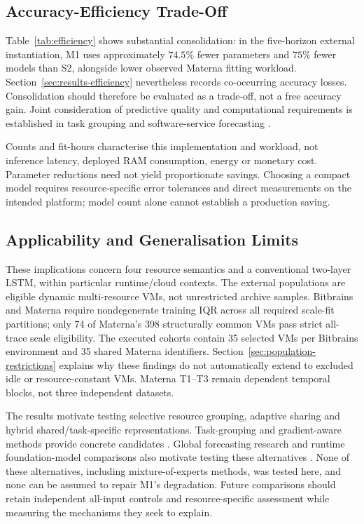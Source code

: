 \documentclass[a4paper,fleqn]{cas-dc}
\begin{document}
\subsection{Accuracy-Efficiency Trade-Off}
\label{sec:discussion-efficiency}

Table~\ref{tab:efficiency} shows substantial consolidation: in the five-horizon
external instantiation, M1 uses approximately $74.5\%$ fewer parameters and
$75\%$ fewer models than S2, alongside lower observed Materna fitting workload.
Section~\ref{sec:results-efficiency} nevertheless records co-occurring accuracy
losses. Consolidation should therefore be evaluated as a trade-off, not a free
accuracy gain. Joint consideration of predictive quality and computational
requirements is established in task grouping and software-service forecasting
\citep{Standley2020TaskGrouping,Syu2017DynamicQoS}.

Counts and fit-hours characterise this implementation and workload, not
inference latency, deployed RAM consumption, energy or monetary cost.
Parameter reductions need not yield proportionate savings. Choosing a compact
model requires resource-specific error tolerances and direct measurements on
the intended platform; model count alone cannot establish a production saving.

\subsection{Applicability and Generalisation Limits}
\label{sec:discussion-applicability}

These implications concern four resource semantics and a conventional
two-layer LSTM, within particular runtime/cloud contexts. The external
populations are eligible dynamic multi-resource VMs, not unrestricted archive
samples. Bitbrains and Materna require nondegenerate training IQR across all
required scale-fit partitions; only 74 of Materna's 398 structurally common
VMs pass strict all-trace scale eligibility. The executed cohorts contain 35
selected VMs per Bitbrains environment and 35 shared Materna identifiers.
Section~\ref{sec:population-restrictions} explains why these findings do not
automatically extend to excluded idle or resource-constant VMs. Materna
T1--T3 remain dependent temporal blocks, not three independent datasets.

The results motivate testing selective resource grouping, adaptive sharing and
hybrid shared/task-specific representations. Task-grouping and gradient-aware
methods provide concrete candidates
\citep{Fifty2021TaskGroupings,Yu2020GradientSurgery,Nochumsohn2025MTLinear}.
Global forecasting research and runtime foundation-model comparisons also
motivate testing these alternatives
\citep{MonteroManso2021GlobalForecasting,DiMenna2026RuntimeForecasting}.
None of these alternatives, including
mixture-of-experts methods, was tested here, and none can be assumed to repair
M1's degradation. Future comparisons should retain independent all-input
controls and resource-specific assessment while measuring the mechanisms
they seek to explain.
\end{document}
